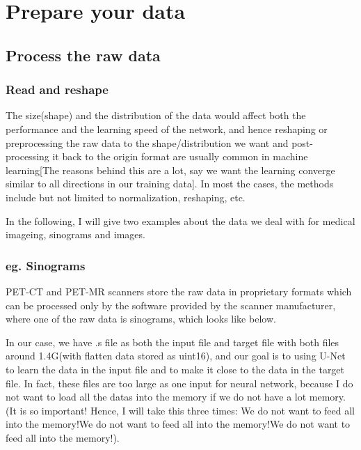 \documentclass[letterpaper,10pt,english]{sphinxmanual}
\begin{document}
\section{Prepare your data}
\label{\detokenize{usage/data:prepare-your-data}}\label{\detokenize{usage/data::doc}}

\subsection{Process the raw data}
\label{\detokenize{usage/data:process-the-raw-data}}

\subsubsection{Read and reshape}
\label{\detokenize{usage/data:read-and-reshape}}
The size(shape) and the distribution of the data would affect both the performance and the learning speed of the network, and hence reshaping or preprocessing the raw data to the shape/distribution we want and post-processing it back to the origin format are usually common in machine learning{[}The reasons behind this are a lot, say we want the learning converge similar to all directions in our training data{]}. In most the cases, the methods include but not limited to normalization, reshaping, etc.

In the following, I will give two examples about the data we deal with for medical imageing, sinograms and images.


\subsubsection{eg. Sinograms}
\label{\detokenize{usage/data:eg-sinograms}}
PET-CT and PET-MR scanners store the raw data in proprietary formats which can be processed only by the software provided by the scanner manufacturer, where one of the raw data is sinograms, which looks like below.

\noindent{}

In our case, we have .s file as both the input file and target file with both files around 1.4G(with flatten data stored as uint16), and our goal is to using U-Net to learn
the data in the input file and to make it close to the data in the target file. In fact, these files are too large as one input for neural network, because I do not want to load all the datas into the memory if we do not have a lot memory. (It is so important! Hence, I will take this three times: We do not want to feed all into the memory!We do not want to feed all into the memory!We do not want to feed all into the memory!).
\end{document}
